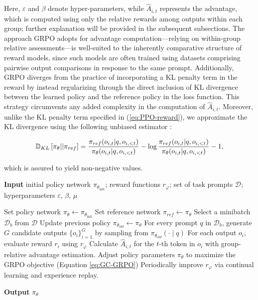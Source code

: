 Here, $\varepsilon$ and $\beta$ denote hyper-parameters, while $\hat{A}_{i,t}$ represents the advantage, which is computed using only the relative rewards among outputs within each group; further explanation will be provided in the subsequent subsections. The approach GRPO adopts for advantage computation—relying on within-group relative assessments—is well-suited to the inherently comparative structure of reward models, since such models are often trained using datasets comprising pairwise output comparisons in response to the same prompt. Additionally, GRPO diverges from the practice of incorporating a KL penalty term in the reward by instead regularizing through the direct inclusion of KL divergence between the learned policy and the reference policy in the loss function. This strategy circumvents any added complexity in the computation of $\hat{A}_{i,t}$. Moreover, unlike the KL penalty term specified in (\ref{eq:PPO-reward}), we approximate the KL divergence using the following unbiased estimator \citep{kl_approx}:

\begin{equation}
\small
    \mathbb{D}_{KL}\left[\pi_{\theta} || \pi_{ref}\right] = \frac{\pi_{ref}(o_{i,t}|q,o_{i,<t})}{\pi_{\theta}(o_{i,t}|q,o_{i,<t})}- \log\frac{\pi_{ref}(o_{i,t}|q,o_{i,<t})}{\pi_{\theta}(o_{i,t}|q,o_{i,<t})} - 1,
\end{equation}

which is assured to yield non-negative values.

\begin{algorithm}[t]
  \small
  \caption{Iterative Group Relative Policy Optimization}
  \textbf{Input} initial policy network $\pi_{\theta_{\text{init}}}$; reward functions $r_\varphi$; set of task prompts $\mathcal{D}$; 
  hyperparameters $\varepsilon$, $\beta$, $\mu$
  \begin{algorithmic}[1]
    \State Set policy network $\pi_\theta \leftarrow \pi_{\theta_{\text{init}}}$
       \State Set reference network $\pi_{ref} \leftarrow \pi_{\theta}$
      \State Select a minibatch $\mathcal{D}_b$ from $\mathcal{D}$
      \State Update previous policy $\pi_{\theta_{old}} \leftarrow \pi_{\theta}$ 
      \State For every prompt $q$ in $\mathcal{D}_b$, generate $G$ candidate outputs $\{o_i\}_{i=1}^G$ by sampling from $\pi_{\theta_{old}} (\cdot \mid q) $
      \State For each output $o_i$, evaluate reward $r_i$ using $r_\varphi$
      \State Calculate $\hat{A}_{i,t}$ for the $t$-th token in $o_i$ with group-relative advantage estimation.
        \State Adjust policy parameters $\pi_{\theta}$ to maximize the GRPO objective (Equation \ref{eq:GC-GRPO})
      \EndFor
    \EndFor \State Periodically improve $r_\varphi$ via continual learning and experience replay. 
    \EndFor 
  \end{algorithmic}
  \textbf{Output} $\pi_\theta$
  \label{alg:iter-grpo}
\end{algorithm}

